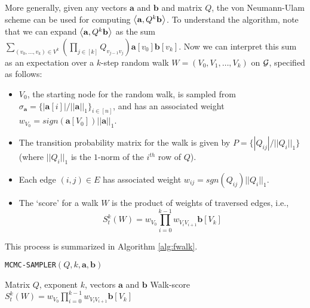 More generally, given any vectors $\mathbf{a}$ and $\mathbf{b}$ and matrix $Q$, the von Neumann-Ulam scheme can be used for computing $\left< \mathbf{a}, Q^k\mathbf{b} \right>$.
To understand the algorithm, note that we can expand $\left< \mathbf{a}, Q^k\mathbf{b} \right>$ as the sum $\sum_{(v_0,\ldots, v_k) \in V^k}\left(\prod_{j \in [k]} Q_{v_{j-1}v_{j}} \right) \mathbf{a}[v_0] \mathbf{b}[v_k]$. 
Now we can interpret this sum as an expectation over a $k$-step random walk $W = (V_0,V_1,\ldots,V_k)$ on ${\mathcal{G}}$, specified as follows:
\begin{itemize}
\item $V_0$, the starting node for the random walk, is sampled from $\sigma_{\mathbf{a}} = \{|\mathbf{a}[i]|/||\mathbf{a}||_1\}_{i\in [n]}$, and has an associated weight $w_{V_0} = sign(\mathbf{a}[V_0])||\mathbf{a}||_1$.
\item The transition probability matrix for the walk is given by $P = \{|Q_{ij}|/||Q_i||_1\}$ (where $||Q_i||_1$ is the $1$-norm of the $i^{th}$ row of $Q$).
\item Each edge $(i,j)\in E$ has associated weight $w_{ij} = sgn(Q_{ij})||Q_i||_1$. 
\item The `score' for a walk $W$ is the product of weights of traversed edges, i.e.,
$$S_t^k(W) = w_{V_0}\prod_{i=0}^{k-1}w_{V_iV_{i+1}}\mathbf{b}[V_{k}]$$
\end{itemize}
This process is summarized in Algorithm \ref{alg:fwalk}. 

\begin{algorithm}[ht]
\caption{\texttt{MCMC-SAMPLER}$(Q, k, \mathbf{a}, \mathbf{b})$}
\label{alg:fwalk}
\begin{algorithmic}[1]
\REQUIRE Matrix $Q$, exponent $k$, vectors $\mathbf{a}$ and $\mathbf{b}$
\RETURN Walk-score $S_{t}^k(W) = w_{V_0}\prod_{i=0}^{k-1}w_{V_iV_{i+1}}\mathbf{b}[V_{k}]$
\end{algorithmic}
\end{algorithm} 

